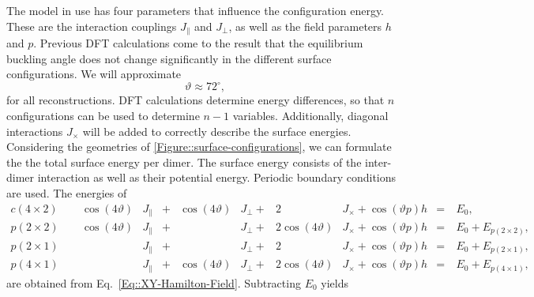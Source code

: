 	The model in use has four parameters that influence the configuration energy. These are the interaction couplings $J_\parallel$ and $J_\perp$, as well as the field parameters $h$ and $p$. Previous DFT calculations come to the result that the equilibrium buckling angle does not change significantly in the different surface configurations. We will approximate \cite{pillay2004revisit, brand2023critical}
	\begin{equation} \label{Eq::exp-buckling-angle}
		\vartheta \approx 72^\circ,
	\end{equation}
	for all reconstructions. DFT calculations determine energy differences, so that $n$ configurations can be used to determine $n-1$ variables. Additionally, diagonal interactions $J_\times$ will be added to correctly describe the surface energies. Considering the geometries of \autoref{Figure::surface-configurations}, we can formulate the the total surface energy per dimer. The surface energy consists of the inter-dimer interaction as well as their potential energy. Periodic boundary conditions are used. The energies of
	\begin{equation}
		\begin{split}
			c(4 \times 2)&~\quad\cos(4\vartheta)&J_\parallel&+& \cos(4\vartheta)&J_\perp+&                  2&J_\times + \cos \left(\vartheta p\right) h &=~ &E_0, \\
			p(2 \times 2)&~\quad\cos(4\vartheta)&J_\parallel&+&                 &J_\perp+&2\cos(4 \vartheta) &J_\times + \cos \left(\vartheta p\right) h &=~ &E_0 + E_{p(2\times 2)}, \\
			p(2 \times 1)&~\quad                &J_\parallel&+&                 &J_\perp+&                  2&J_\times + \cos \left(\vartheta p\right) h &=~ &E_0 + E_{p(2\times 1)}, \\
			p(4 \times 1)&~\quad                &J_\parallel&+& \cos(4\vartheta)&J_\perp+&2\cos(4 \vartheta) &J_\times + \cos \left(\vartheta p\right) h &=~ &E_0 + E_{p(4\times 1)},
		\end{split}
	\end{equation}
	are obtained from Eq.~\eqref{Eq::XY-Hamilton-Field}. Subtracting $E_0$ yields

